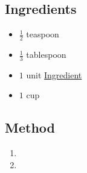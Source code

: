 \documentclass[11pt,a4paper]{article}
\begin{document}
\subsection*{Ingredients}

\begin{multicols}{2}

\begin{itemize}
   \item $ \frac{1}{2} $ teaspoon
   \item $ \frac{1}{3} $ tablespoon
   \item $ 1 $ unit \href{https://en.wikipedia.org/wiki/Ingredient}{Ingredient}
\end{itemize}

\columnbreak

\begin{itemize}
   \item $ 1 $ cup
\end{itemize}

\end{multicols}

\medskip

\subsection*{Method}

\begin{enumerate}
   \item \lipsum[2]
   \item \lipsum[3]
\end{enumerate}
\end{document}
